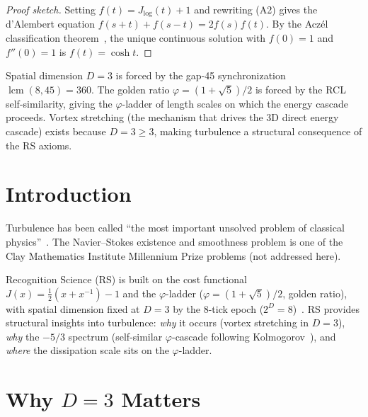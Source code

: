 \documentclass[12pt,a4paper]{article}
\theoremstyle{definition}
\theoremstyle{remark}
\begin{document}
\begin{proof}[Proof sketch]
Setting $f(t) = J_{\log}(t) + 1$ and rewriting \textup{(A2)} gives the
d'Alembert equation $f(s+t) + f(s-t) = 2f(s)f(t)$.  By the Acz\'el
classification theorem~\cite{Aczel1966}, the unique continuous solution
with $f(0) = 1$ and $f''(0) = 1$ is $f(t) = \cosh t$.
\end{proof}

\noindent Spatial dimension $D = 3$ is forced by the gap-45
synchronization $\operatorname{lcm}(8,45) = 360$.  The golden ratio
$\varphi = (1+\sqrt{5})/2$ is forced by the RCL self-similarity, giving
the $\varphi$-ladder of length scales on which the energy cascade
proceeds.  Vortex stretching (the mechanism that drives the 3D direct
energy cascade) exists because $D = 3 \geq 3$, making turbulence a
structural consequence of the RS axioms.

\section{Introduction}
\label{sec:intro}

Turbulence has been called ``the most important unsolved problem
of classical physics''~\cite{Feynman1964}.  The Navier--Stokes
existence and smoothness problem is one of the Clay Mathematics
Institute Millennium Prize problems (not addressed here).

Recognition Science (RS) is built on the cost functional
$J(x) = \tfrac{1}{2}(x + x^{-1}) - 1$ and the $\varphi$-ladder
($\varphi = (1+\sqrt{5})/2$, golden ratio), with spatial
dimension fixed at $D = 3$ by the 8-tick epoch
($2^D = 8$)~\cite{RS_Axioms}.  RS provides structural insights
into turbulence: \emph{why} it occurs (vortex stretching in
$D = 3$), \emph{why} the $-5/3$ spectrum (self-similar
$\varphi$-cascade following Kolmogorov~\cite{Kolmogorov1941}),
and \emph{where} the dissipation scale sits on the
$\varphi$-ladder.

\section{Why $D = 3$ Matters}
\label{sec:d3}
\end{document}
